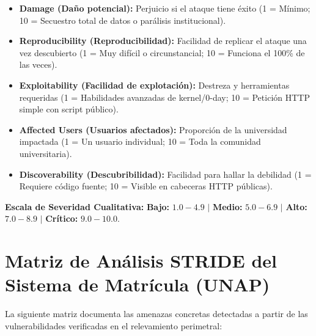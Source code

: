 \begin{itemize}[itemsep=3pt,topsep=2pt,parsep=0pt]
    \item \textbf{Damage (Daño potencial):} Perjuicio si el ataque tiene éxito (1 = Mínimo; 10 = Secuestro total de datos o parálisis institucional).
    \item \textbf{Reproducibility (Reproducibilidad):} Facilidad de replicar el ataque una vez descubierto (1 = Muy difícil o circunstancial; 10 = Funciona el 100\% de las veces).
    \item \textbf{Exploitability (Facilidad de explotación):} Destreza y herramientas requeridas (1 = Habilidades avanzadas de kernel/0-day; 10 = Petición HTTP simple con script público).
    \item \textbf{Affected Users (Usuarios afectados):} Proporción de la universidad impactada (1 = Un usuario individual; 10 = Toda la comunidad universitaria).
    \item \textbf{Discoverability (Descubribilidad):} Facilidad para hallar la debilidad (1 = Requiere código fuente; 10 = Visible en cabeceras HTTP públicas).
\end{itemize}

\noindent\textbf{Escala de Severidad Cualitativa:}
\textbf{Bajo:} $1.0 - 4.9$ \quad$\vert$\quad
\textbf{Medio:} $5.0 - 6.9$ \quad$\vert$\quad
\textbf{Alto:} $7.0 - 8.9$ \quad$\vert$\quad
\textbf{Crítico:} $9.0 - 10.0$.

\section{Matriz de Análisis STRIDE del Sistema de Matrícula (UNAP)}

La siguiente matriz documenta las amenazas concretas detectadas a partir de las vulnerabilidades verificadas en el relevamiento perimetral:


